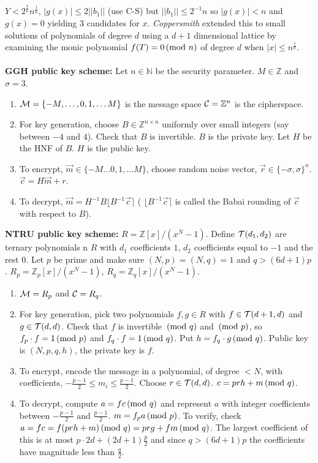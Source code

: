 $Y < 2^{\frac 7 6} n^{\frac 1 6}$, $|g(x)| \le 2 || b_1 ||$ (use C-S) but
$||b_1|| \le 2^{-1} n$ so $|g(x)| < n$ and $g(x)=0$ yielding 3 candidates for $x$.
\emph{Coppersmith} extended this to small solutions of polynomials of degree $d$ using
a $d+1$ dimensional lattice by examining the monic polynomial $f(T)= 0 \thinspace \textnormal{(mod } n \textnormal{)}$ of
degree $d$ when $|x| \le n^{\frac 1 d}$.
\\
\\
{\bf GGH public key scheme: }
Let $n \in {\mathbb N}$ be the security parameter. $M \in {\mathbb Z}$ and $\sigma = 3$.
\begin{enumerate}
\item ${\cal M} = \{ -M, \ldots , 0, 1, \ldots M\}$ is the message space ${\cal C} = {\mathbb Z}^n$ is the cipherspace.
\item For key generation, choose $B \in {\mathbb Z}^{n \times n}$ uniformly over small integers (say between $-4$ and
$4$).  Check that $B$ is invertible.  $B$ is the private key.  Let $H$ be the HNF of $B$.  $H$ is the public key.
\item To encrypt, ${\vec m} \in \{ -M \ldots 0, 1, \ldots M\}$,
choose random noise vector, ${\vec r} \in \{ -\sigma, \sigma \}^n$.  ${\vec c} = H{\vec m} + r$.
\item To decrypt, ${\vec m} = H^{-1} B \lfloor B^{-1} {\vec c}\rceil$ ( $ \lfloor B^{-1} {\vec c} \rceil$ is
called the Babai rounding of ${\vec c}$ with respect to  $B$).
\end{enumerate}
{\bf NTRU public key scheme: }
$R = {\mathbb Z}[x]/(x^N-1)$.  Define ${\cal T}(d_1, d_2)$ are ternary polynomials n $R$
with $d_1$ coefficients $1$, $d_2$ coefficients
equal to $-1$ and the rest $0$.  Let $p$ be prime and make sure $(N,p)=(N,q)=1$ and $q > (6d+1)p$.
$R_p = {\mathbb Z}_p[x]/(x^N-1)$, $R_q = {\mathbb Z}_q[x]/(x^N-1)$.
\begin{enumerate}
\item ${\cal M} = R_p$ and ${\cal C} = R_q$.
\item For key generation, pick two polynomials $f, g \in R$ with $f \in {\cal T}(d+1, d)$ and
$g \in {\cal T}(d,d)$.  Check that $f$ is invertible $\thinspace \textnormal{(mod } q \textnormal{)}$ and $\thinspace \textnormal{(mod } p \textnormal{)}$, so
$f_p \cdot f = 1 \thinspace \textnormal{(mod } p \textnormal{)}$ and
$f_q \cdot f = 1 \thinspace \textnormal{(mod } q \textnormal{)}$.  Put $h = f_q \cdot g \thinspace \textnormal{(mod } q \textnormal{)}$.
Public key is $(N, p, q,h)$, the private key is $f$.
\item To encrypt, encode the message in a polynomial, of degree $<N$, with coefficients,
$-{\frac {p-1} 2} \leq m_i \leq {\frac {p-1} 2}$.  Choose $r \in {\cal T}(d,d)$.
$c = prh+m \thinspace \textnormal{(mod } q \textnormal{)}$.
\item To decrypt, compute $a = fc \thinspace \textnormal{(mod } q \textnormal{)}$ and represent $a$ with integer coefficients between
$-{\frac {p-1} 2}$ and ${\frac {p-1} 2}$.  $m = f_p a \thinspace \textnormal{(mod } p \textnormal{)}$.  To verify, check
$a=fc=f(prh+m) \thinspace \textnormal{(mod } q \textnormal{)} = prg + fm \thinspace \textnormal{(mod } q \textnormal{)}$.  The largest coefficient of this is at most
$p\cdot 2d + (2d+1){\frac p 2}$ and since $q > (6d+1)p$ the coefficients have magnitude less than ${\frac q 2}$.
\end{enumerate}
